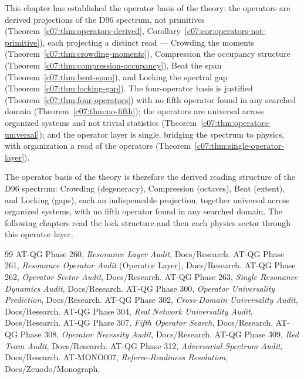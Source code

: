 This chapter has established the operator basis of the theory: the operators are derived
projections of the D96 spectrum, not primitives (Theorem~\ref{c07:thm:operators-derived},
Corollary~\ref{c07:cor:operators-not-primitive}), each projecting a distinct read ---
Crowding the moments (Theorem~\ref{c07:thm:crowding-moments}), Compression the occupancy
structure (Theorem~\ref{c07:thm:compression-occupancy}), Beat the span
(Theorem~\ref{c07:thm:beat-span}), and Locking the spectral gap
(Theorem~\ref{c07:thm:locking-gap}). The four-operator basis is justified
(Theorem~\ref{c07:thm:four-operators}) with no fifth operator found in any searched domain
(Theorem~\ref{c07:thm:no-fifth}); the operators are universal across organized systems and
not trivial statistics (Theorem~\ref{c07:thm:operators-universal}); and the operator layer
is single, bridging the spectrum to physics, with organization a read of the operators
(Theorem~\ref{c07:thm:single-operator-layer}).

The operator basis of the theory is therefore the derived reading structure of the D96
spectrum: Crowding (degeneracy), Compression (octaves), Beat (extent), and Locking (gaps),
each an indispensable projection, together universal across organized systems, with no fifth
operator found in any searched domain. The following chapters read the lock structure and
then each physics sector through this operator layer.

\begin{thebibliography}{99}
 AT-QG Phase 260, \emph{Resonance Layer Audit}, Docs/Research.
 AT-QG Phase 261, \emph{Resonance Operator Audit} (Operator Layer), Docs/Research.
 AT-QG Phase 262, \emph{Operator Sector Audit}, Docs/Research.
 AT-QG Phase 263, \emph{Single Resonance Dynamics Audit}, Docs/Research.
 AT-QG Phase 300, \emph{Operator Universality Prediction}, Docs/Research.
 AT-QG Phase 302, \emph{Cross-Domain Universality Audit}, Docs/Research.
 AT-QG Phase 304, \emph{Real Network Universality Audit}, Docs/Research.
 AT-QG Phase 307, \emph{Fifth Operator Search}, Docs/Research.
 AT-QG Phase 308, \emph{Operator Necessity Audit}, Docs/Research.
 AT-QG Phase 309, \emph{Red Team Audit}, Docs/Research.
 AT-QG Phase 312, \emph{Adversarial Spectrum Audit}, Docs/Research.
 AT-MONO007, \emph{Referee-Readiness Resolution}, Docs/Zenodo/Monograph.
\end{thebibliography}
